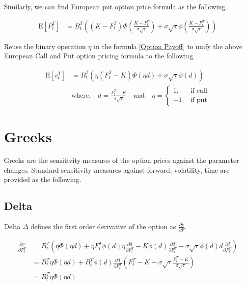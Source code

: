 \documentclass{article}
\begin{document}
Similarly, we can find European put option price formula as the following.

\begin{align} \label{European Put Option Price}
    \mathrm{E}\left[P_t^T\right] &= B_t^T \left(\left(K - F_t^T\right) \Phi\left(\frac{K - F_t^T}{\sigma \sqrt{\tau}}\right) + \sigma \sqrt{\tau} \phi\left(\frac{K - F_t^T}{\sigma \sqrt{\tau}}\right) \right)
\end{align}

Reuse the binary operation $ \eta $ in the formula \ref{Option Payoff} to unify the above European Call and Put option pricing formula to the following.

\begin{align} \label{European Option Price Formula}
    \mathrm{E}\left[v_t^T\right] &= B_t^T \left(\eta \left(F_t^T - K\right) \Phi\left(\eta d \right) + \sigma \sqrt{\tau} \phi\left(d\right)\right) \nonumber \\ 
    &\text{where,} \quad d = \frac{F_t^T - K}{\sigma \sqrt{\tau}} \quad \text{and} \quad \eta =
    \begin{cases} 
        1, & \mbox{if call} \\
        -1, & \mbox{if put}
    \end{cases}
\end{align}


\section{Greeks}

Greeks are the sensitivity measures of the option prices against the parameter changes.
Standard sensitivity measures against forward, volatility, time are provided as the following.

\subsection{Delta}

Delta $ \Delta $ defines the first order derivative of the option as $ \frac{\partial v}{\partial F} $.


\begin{align} \label{Delta Formula}
    \frac{\partial v}{\partial F_t^T} &= B_t^T \left(\eta \Phi(\eta d) + \eta F_t^T \phi(d) \eta \frac{\partial d}{\partial F_t^T} - K \phi(d) \frac{\partial d}{\partial F_t^T} - \sigma \sqrt{\tau} \phi(d) d \frac{\partial d}{\partial F_t^T} \right) \nonumber \\
    &= B_t^T \eta \Phi\left(\eta d\right) + B_t^T \phi(d) \frac{\partial d}{\partial F_t^T} \left(F_t^T - K - \sigma \sqrt{\tau} \frac{F_t^T - K}{\sigma \sqrt{\tau}} \right) \nonumber \\
    &= B_t^T \eta \Phi\left(\eta d\right)
\end{align}
\end{document}
